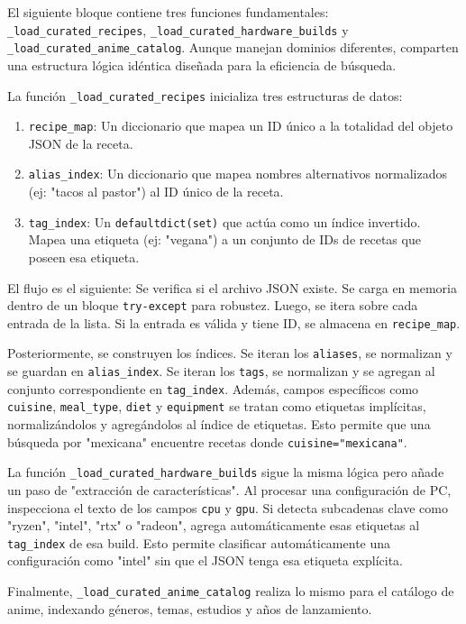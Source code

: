 \documentclass[letterpaper,12pt]{article}
\begin{document}
El siguiente bloque contiene tres funciones fundamentales: \texttt{\_load\_curated\_recipes}, \texttt{\_load\_curated\_hardware\_builds} y \texttt{\_load\_curated\_anime\_catalog}. Aunque manejan dominios diferentes, comparten una estructura lógica idéntica diseñada para la eficiencia de búsqueda.

La función \texttt{\_load\_curated\_recipes} inicializa tres estructuras de datos:
\begin{enumerate}
    \item \texttt{recipe\_map}: Un diccionario que mapea un ID único a la totalidad del objeto JSON de la receta.
    \item \texttt{alias\_index}: Un diccionario que mapea nombres alternativos normalizados (ej: "tacos al pastor") al ID único de la receta.
    \item \texttt{tag\_index}: Un \texttt{defaultdict(set)} que actúa como un índice invertido. Mapea una etiqueta (ej: "vegana") a un conjunto de IDs de recetas que poseen esa etiqueta.
\end{enumerate}

El flujo es el siguiente: Se verifica si el archivo JSON existe. Se carga en memoria dentro de un bloque \texttt{try-except} para robustez. Luego, se itera sobre cada entrada de la lista. Si la entrada es válida y tiene ID, se almacena en \texttt{recipe\_map}.

Posteriormente, se construyen los índices. Se iteran los \texttt{aliases}, se normalizan y se guardan en \texttt{alias\_index}. Se iteran los \texttt{tags}, se normalizan y se agregan al conjunto correspondiente en \texttt{tag\_index}. Además, campos específicos como \texttt{cuisine}, \texttt{meal\_type}, \texttt{diet} y \texttt{equipment} se tratan como etiquetas implícitas, normalizándolos y agregándolos al índice de etiquetas. Esto permite que una búsqueda por "mexicana" encuentre recetas donde \texttt{cuisine="mexicana"}.

La función \texttt{\_load\_curated\_hardware\_builds} sigue la misma lógica pero añade un paso de "extracción de características". Al procesar una configuración de PC, inspecciona el texto de los campos \texttt{cpu} y \texttt{gpu}. Si detecta subcadenas clave como "ryzen", "intel", "rtx" o "radeon", agrega automáticamente esas etiquetas al \texttt{tag\_index} de esa build. Esto permite clasificar automáticamente una configuración como "intel" sin que el JSON tenga esa etiqueta explícita.

Finalmente, \texttt{\_load\_curated\_anime\_catalog} realiza lo mismo para el catálogo de anime, indexando géneros, temas, estudios y años de lanzamiento.
\end{document}
